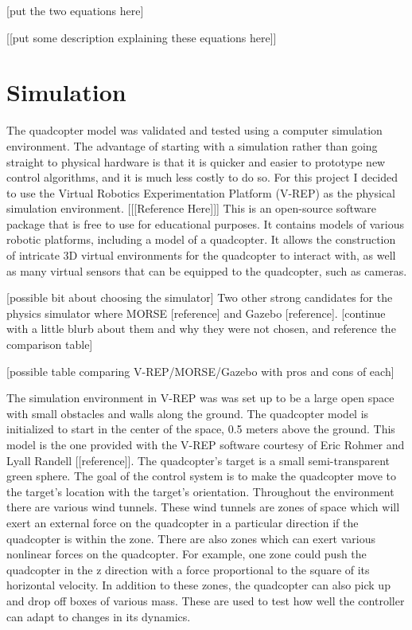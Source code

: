\documentclass[letterpaper,12pt,titlepage,oneside,final]{book}
\begin{document}
[put the two equations here]

[[put some description explaining these equations here]]

\section{Simulation}


The quadcopter model was validated and tested using a computer simulation environment. The advantage of starting with a simulation rather than going straight to physical hardware is that it is quicker and easier to prototype new control algorithms, and it is much less costly to do so. For this project I decided to use the Virtual Robotics Experimentation Platform (V-REP) as the physical simulation environment. [[[Reference Here]]] This is an open-source software package that is free to use for educational purposes. It contains models of various robotic platforms, including a model of a quadcopter. It allows the construction of intricate 3D virtual environments for the quadcopter to interact with, as well as many virtual sensors that can be equipped to the quadcopter, such as cameras.

[possible bit about choosing the simulator]
Two other strong candidates for the physics simulator where MORSE [reference] and Gazebo [reference]. [continue with a little blurb about them and why they were not chosen, and reference the comparison table]

[possible table comparing V-REP/MORSE/Gazebo with pros and cons of each]

The simulation environment in V-REP was was set up to be a large open space with small obstacles and walls along the ground. The quadcopter model is initialized to start in the center of the space, 0.5 meters above the ground. This model is the one provided with the V-REP software courtesy of Eric Rohmer and Lyall Randell [[reference]]. The quadcopter’s target is a small semi-transparent green sphere. The goal of the control system is to make the quadcopter move to the target’s location with the target’s orientation. Throughout the environment there are various wind tunnels. These wind tunnels are zones of space which will exert an external force on the quadcopter in a particular direction if the quadcopter is within the zone. There are also zones which can exert various nonlinear forces on the quadcopter. For example, one zone could push the quadcopter in the z direction with a force proportional to the square of its horizontal velocity. In addition to these zones, the quadcopter can also pick up and drop off boxes of various mass. These are used to test how well the controller can adapt to changes in its dynamics.
\end{document}
